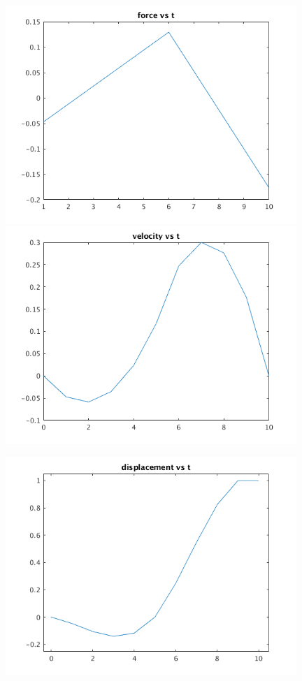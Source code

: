 \documentclass[12pt,letter]{article}
\begin{document}
\begin{enumerate}
\begin{itemize}
    \begin{figure}[H]
      \centering
      \includegraphics[width=11cm]{q9/part_b_plot_1.png}
      \includegraphics[width=11cm]{q9/part_b_plot_2.png}
    \end{figure}
    \begin{figure}[H]
      \centering
      \includegraphics[width=11cm]{q9/part_b_plot_3.png}

\end{figure}
\end{itemize}
\end{enumerate}
\end{document}
